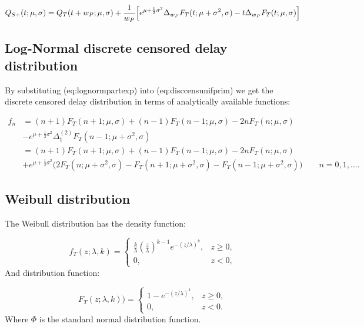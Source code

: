 \documentclass[10pt,letterpaper]{article}
\begin{document}
\begin{equation}
Q_{S+}(t ;\mu, \sigma) = Q_T(t + w_P;\mu, \sigma) + { 1 \over w_P} \Big[ e^{\mu + \frac{1}{2} \sigma^2} \Delta_{w_P}F_T(t; \mu + \sigma^2, \sigma) - t\Delta_{w_P}F_T(t; \mu, \sigma) \Big]
\end{equation}

\subsection{Log-Normal discrete censored delay distribution}

By substituting \@ref(eq:lognormpartexp) into \@ref(eq:disccensunifprim) we get the discrete censored delay distribution in terms of analytically available functions:

\begin{equation}
\begin{aligned}
f_n &= (n+1) F_T(n+1; \mu, \sigma) + (n-1) F_T(n-1; \mu, \sigma) - 2 n F_T(n; \mu, \sigma) \\
 &- e^{\mu + \frac{1}{2} \sigma^2} \Delta_1^{(2)}F_T(n-1;\mu + \sigma^2, \sigma) \\
 &= (n+1) F_T(n+1; \mu, \sigma) + (n-1) F_T(n-1; \mu, \sigma) - 2 n F_T(n; \mu, \sigma) \\
  &+ e^{\mu + \frac{1}{2} \sigma^2} \Big( 2 F_T(n; \mu + \sigma^2, \sigma) - F_T(n+1; \mu + \sigma^2, \sigma) - F_T(n-1; \mu + \sigma^2, \sigma)  \Big)\qquad n = 0, 1, \dots.
\end{aligned}
\end{equation}

\subsection{Weibull distribution}

The Weibull distribution has the density function:

\begin{equation}
f_T(z;\lambda,k) =
\begin{cases}
\frac{k}{\lambda}\left(\frac{z}{\lambda}\right)^{k-1}e^{-(z/\lambda)^{k}}, & z\geq0 ,\\
0, & z<0,
\end{cases}
\end{equation}
And distribution function:

\begin{equation}
F_T(z;\lambda,k))=\begin{cases}1 - e^{-(z/\lambda)^k}, & z\geq0,\\ 0, & z<0.\end{cases}
\end{equation}
Where $\Phi$ is the standard normal distribution function.
\end{document}
